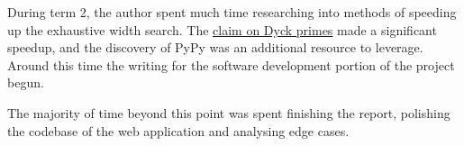 During term 2, the author spent much time researching into methods of speeding up the exhaustive width search. The \hyperref[claim:samePrime]{claim on Dyck primes} made a significant speedup, and the discovery of PyPy was an additional resource to leverage. Around this time the writing for the software development portion of the project begun. 

The majority of time beyond this point was spent finishing the report, polishing the codebase of the web application and analysing edge cases.